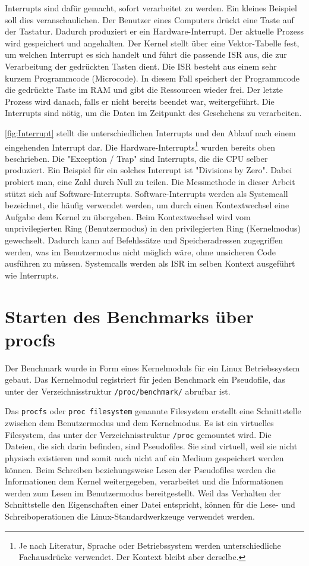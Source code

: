Interrupts sind dafür gemacht, sofort verarbeitet zu werden. Ein kleines Beispiel soll dies veranschaulichen. Der Benutzer eines Computers drückt eine Taste auf der Tastatur. Dadurch produziert er ein Hardware-Interrupt. Der aktuelle Prozess wird gespeichert und angehalten. Der Kernel stellt über eine Vektor-Tabelle fest, um welchen Interrupt es sich handelt und führt die passende ISR aus, die zur Verarbeitung der gedrückten Tasten dient. Die ISR besteht aus einem sehr kurzem Programmcode (Microcode). In diesem Fall speichert der Programmcode die gedrückte Taste im RAM und gibt die Ressourcen wieder frei. Der letzte Prozess wird danach, falls er nicht bereits beendet war, weitergeführt. Die Interrupts sind nötig, um die Daten im Zeitpunkt des Geschehens zu verarbeiten.
\par

\autoref{fig:Interrupt} stellt die unterschiedlichen Interrupts und den Ablauf nach einem eingehenden Interrupt dar. Die Hardware-Interrupts\footnote{Je nach Literatur, Sprache oder Betriebssystem werden unterschiedliche Fachausdrücke verwendet. Der Kontext bleibt aber derselbe.} wurden bereits oben beschrieben. Die "Exception / Trap" sind Interrupts, die die CPU selber produziert. Ein Beispiel für ein solches Interrupt ist "Divisions by Zero". Dabei probiert man, eine Zahl durch Null zu teilen. Die Messmethode in dieser Arbeit stützt sich auf Software-Interrupts. Software-Interrupts werden als Systemcall bezeichnet, die häufig verwendet werden, um durch einen Kontextwechsel eine Aufgabe dem Kernel zu übergeben. Beim Kontextwechsel wird vom unprivilegierten Ring (Benutzermodus) in den privilegierten Ring (Kernelmodus) gewechselt. Dadurch kann auf Befehlssätze und Speicheradressen zugegriffen werden, was im Benutzermodus nicht möglich wäre, ohne unsicheren Code ausführen zu müssen. Systemcalls werden als ISR im selben Kontext ausgeführt wie Interrupts.




\section{Starten des Benchmarks über procfs}

Der Benchmark wurde in Form eines Kernelmoduls für ein Linux Betriebssystem gebaut. Das Kernelmodul registriert für jeden Benchmark ein Pseudofile, das unter der Verzeichnisstruktur \texttt{/proc/benchmark/} abrufbar ist.
\par
Das \texttt{procfs} oder \texttt{proc filesystem} genannte Filesystem erstellt eine Schnittstelle zwischen dem Benutzermodus und dem Kernelmodus. Es ist ein virtuelles Filesystem, das unter der Verzeichnisstruktur \texttt{/proc} gemountet wird\cite{mauerer2010professional}. Die Dateien, die sich darin befinden, sind Pseudofiles. Sie sind virtuell, weil sie nicht physisch existieren und somit auch nicht auf ein Medium gespeichert werden können. Beim Schreiben beziehungsweise Lesen der Pseudofiles werden die Informationen dem Kernel weitergegeben, verarbeitet und die Informationen werden zum Lesen im Benutzermodus bereitgestellt. Weil das Verhalten der Schnittstelle den Eigenschaften einer Datei entspricht, können für die Lese- und Schreiboperationen die Linux-Standardwerkzeuge verwendet werden.

